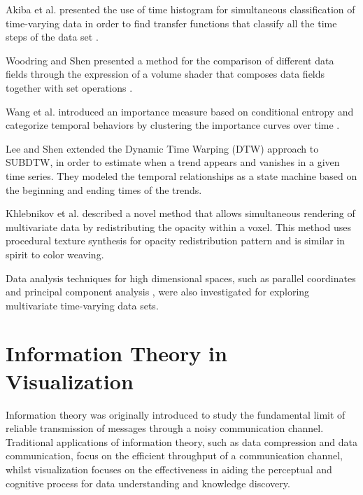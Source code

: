Akiba et al. presented the use of time histogram for simultaneous classification of time-varying data in order to find transfer functions that classify all the time steps of the data set \cite{akiba_simultaneous_2006}.

Woodring and Shen presented a method for the comparison of different data fields through the expression of a volume shader that composes data fields together with set operations \cite{woodring_multi-variate_2006}.

Wang et al. introduced an importance measure based on conditional entropy and categorize temporal behaviors by clustering the importance curves over time \cite{wang_importance-driven_2008}.

Lee and Shen \cite{lee_visualization_2009} extended the Dynamic Time Warping (DTW) approach \cite{lee_visualizing_2009} to SUBDTW, in order to estimate when a trend appears and vanishes in a given time series. They modeled the temporal relationships as a state machine based on the beginning and ending times of the trends.

Khlebnikov et al. \cite{khlebnikov_noise-based_2013} described a novel method that allows simultaneous rendering of multivariate data by redistributing the opacity within a voxel. This method uses procedural texture synthesis \cite{khlebnikov_procedural_2012} for opacity redistribution pattern and is similar in spirit to color weaving.

Data analysis techniques for high dimensional spaces, such as parallel coordinates \cite{akiba_visualizing_2007} \cite{guo_scalable_2012} and principal component analysis \cite{liu_multivariate_2014}, were also investigated for exploring multivariate time-varying data sets.


\section{Information Theory in Visualization}
Information theory \cite{shannon_mathematical_1948} was originally introduced to study the fundamental limit of reliable transmission of messages through a noisy communication channel. Traditional applications of information theory, such as data compression and data communication, focus on the efficient throughput of a communication channel, whilst visualization focuses on the effectiveness in aiding the perceptual and cognitive process for data understanding and knowledge discovery.

